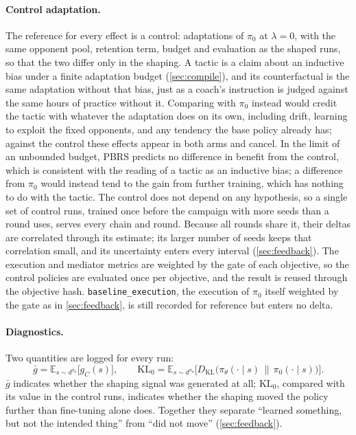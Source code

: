 \documentclass[11pt]{article}
\newcommand{\E}{\mathbb{E}}
\newcommand{\KL}{D_{\mathrm{KL}}}
\newcommand{\gbar}{\bar{g}}
\newcommand{\code}[1]{\texttt{\small #1}}
\begin{document}
\paragraph{Control adaptation.}
The reference for every effect is a control: adaptations of $\pi_0$ at $\lambda = 0$, with the same opponent pool, retention term, budget and evaluation as the shaped runs, so that the two differ only in the shaping.
A tactic is a claim about an inductive bias under a finite adaptation budget (\cref{sec:compile}), and its counterfactual is the same adaptation without that bias, just as a coach's instruction is judged against the same hours of practice without it.
Comparing with $\pi_0$ instead would credit the tactic with whatever the adaptation does on its own, including drift, learning to exploit the fixed opponents, and any tendency the base policy already has; against the control these effects appear in both arms and cancel.
In the limit of an unbounded budget, PBRS predicts no difference in benefit from the control, which is consistent with the reading of a tactic as an inductive bias; a difference from $\pi_0$ would instead tend to the gain from further training, which has nothing to do with the tactic.
The control does not depend on any hypothesis, so a single set of control runs, trained once before the campaign with more seeds than a round uses, serves every chain and round.
Because all rounds share it, their deltas are correlated through its estimate; its larger number of seeds keeps that correlation small, and its uncertainty enters every interval (\cref{sec:feedback}).
The execution and mediator metrics are weighted by the gate of each objective, so the control policies are evaluated once per objective, and the result is reused through the objective hash.
\code{baseline\_execution}, the execution of $\pi_0$ itself weighted by the gate as in \cref{sec:feedback}, is still recorded for reference but enters no delta.

\paragraph{Diagnostics.}
Two quantities are logged for every run:
\begin{equation}
  \gbar = \E_{s\sim d^{\pi_\theta}}\bigl[g_C(s)\bigr], \qquad
  \mathrm{KL}_0 = \E_{s\sim d^{\pi_\theta}}\bigl[\KL\bigl(\pi_\theta(\cdot\mid s)\,\|\,\pi_0(\cdot\mid s)\bigr)\bigr].
\end{equation}
$\gbar$ indicates whether the shaping signal was generated at all; $\mathrm{KL}_0$, compared with its value in the control runs, indicates whether the shaping moved the policy further than fine-tuning alone does.
Together they separate ``learned something, but not the intended thing'' from ``did not move'' (\cref{sec:feedback}).
\end{document}
